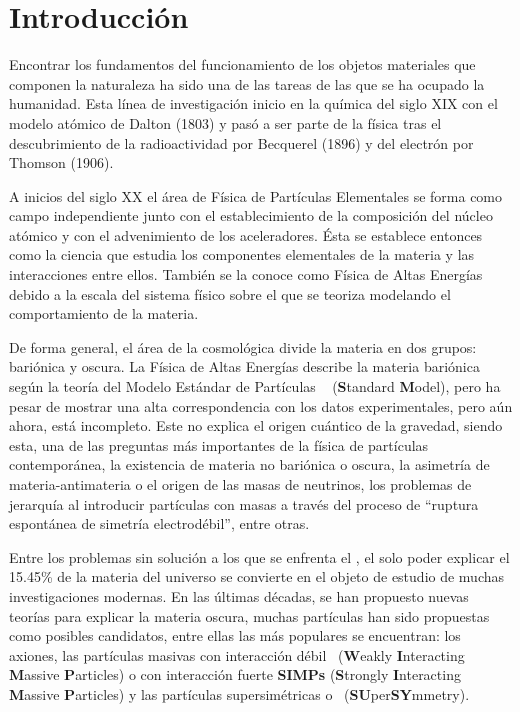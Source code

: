 \chapter*{Introducción}

Encontrar los fundamentos del funcionamiento de los objetos materiales que componen la naturaleza ha sido una de las tareas de las que se ha ocupado la humanidad. Esta línea de investigación inicio en la química del siglo XIX con el modelo atómico de Dalton (1803) y pasó a ser parte de la física tras el descubrimiento de la radioactividad por %
Becquerel (1896) y del electrón por Thomson (1906).

A inicios del siglo XX el área de Física de Partículas Elementales se forma como campo independiente junto con el establecimiento de la composición del núcleo atómico y con el advenimiento de los aceleradores. Ésta se establece entonces como la ciencia que estudia los componentes elementales de la materia y las interacciones entre ellos. También se la conoce como Física de Altas Energías debido a la escala del sistema físico sobre el que se teoriza modelando el comportamiento de la materia.

De forma general, el área de la cosmológica divide la materia en dos grupos: bariónica y oscura. La Física de Altas Energías describe la materia bariónica según la teoría del Modelo Estándar de Partículas \ME ~ (\textbf{S}tandard \textbf{M}odel), pero ha pesar de mostrar una alta correspondencia con los datos experimentales, pero aún ahora, está incompleto. Este no explica el origen cuántico de la gravedad, siendo esta, una de las preguntas más importantes de la física de partículas contemporánea, la existencia de materia no bariónica o oscura, la asimetría de materia-antimateria o el origen de las masas de neutrinos, los problemas de jerarquía al introducir partículas con masas a través del proceso de ``ruptura espontánea de simetría electrodébil'', entre otras. 


Entre los problemas sin solución a los que se enfrenta el \ME, el solo poder explicar el 15.45\% de la materia del universo se convierte en el objeto de estudio de muchas investigaciones modernas. En las últimas décadas, se han propuesto nuevas teorías para explicar la materia oscura, muchas partículas han sido propuestas como posibles candidatos, entre ellas las más populares se encuentran: los axiones, las partículas masivas con interacción  débil \WIMPs ~(\textbf{W}eakly \textbf{I}nteracting \textbf{M}assive \textbf{P}articles) o con interacción fuerte \textbf{SIMPs} (\textbf{S}trongly \textbf{I}nteracting \textbf{M}assive \textbf{P}articles) y las partículas supersimétricas o \SUSY~(\textbf{SU}per\textbf{SY}mmetry).%

